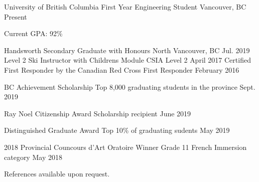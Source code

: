 \documentclass[]{awesome-cv}
\begin{document}
\begin{cventries}
  \cventry
  {University of British Columbia}
  {First Year Engineering Student}
  {Vancouver, BC}
  {Present}
  {\begin{cvitems}
     \item Current GPA: 92\% 
    \end{cvitems}}
  \cventry
  {Handsworth Secondary}
  {Graduate with Honours}
  {North Vancouver, BC}
  {Jul. 2019}
  {}
  \cventry
  {Level 2 Ski Instructor with Children\textquotesingle{}s Module}
  {CSIA Level 2}
  {}
  {April 2017}
  {}
  \cventry
  {Certified First Responder by the Canadian Red Cross}
  {First Responder}
  {}
  {February 2016}
  {}
\end{cventries}

\begin{cvhonors}
  \cvhonor
  {BC Achievement Scholarship}
  {Top 8,000 graduating students in the province}
  {}
  {Sept. 2019}

  \cvhonor
  {Ray Noel Citizenship Award}
  {Scholarship recipient}
  {}
  {June 2019}

  \cvhonor
  {Distinguished Graduate Award}
  {Top 10\% of graduating sudents}
  {}
  {May 2019}

  \cvhonor
  {2018 Provincial Councours d'Art Oratoire Winner}
  {Grade 11 French Immersion category}
  {}
  {May 2018}

\end{cvhonors}

References available upon request.
\end{document}
